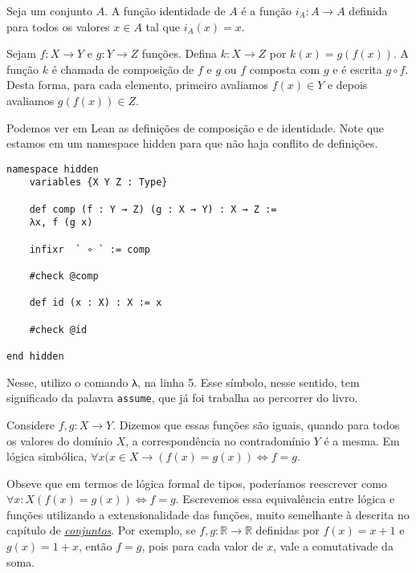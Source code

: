 \begin{definition}
    \label{def1}
    Seja um conjunto $A$. A função identidade de $A$ é a função $i_A : A
    \rightarrow A$ definida para todos os valores $x \in A$ tal que $i_A(x) =
    x$.
\end{definition}

\begin{definition}
    \label{def2}
    Sejam $f : X \rightarrow Y$ e $g : Y \rightarrow Z$ funções. Defina $k : X
    \rightarrow Z$ por $k(x) = g(f(x))$. A função $k$ é chamada de composição
    de $f$ e $g$ ou $f$ composta com $g$ e é escrita $g \circ f$. Desta forma,
    para cada elemento, primeiro  avaliamos $f(x) \in Y$ e depois avaliamos
    $g(f(x)) \in Z$.
\end{definition}

Podemos ver em Lean as definições de composição e de identidade. Note que
estamos em um namespace hidden para que não haja conflito de definições.

\begin{lstlisting}
namespace hidden
    variables {X Y Z : Type}

    def comp (f : Y → Z) (g : X → Y) : X → Z :=
    λx, f (g x)

    infixr  ` ∘ ` := comp

    #check @comp

    def id (x : X) : X := x

    #check @id

end hidden
\end{lstlisting}

Nesse, utilizo o comando \lstinline{λ}, na linha 5. Esse símbolo, nesse
sentido, tem significado da palavra \lstinline{assume}, que já foi trabalha ao
percorrer do livro.

\begin{definition}
    \label{def3}
    Considere $f,g : X \to Y$. Dizemos que essas funções são iguais, quando
    para todos os valores do domínio $X$, a correspondência no contradomínio
    $Y$ é a mesma. Em lógica simbólica, $\forall x (x \in X \to (f(x) = g(x))
    \iff f = g $.
\end{definition}

Obseve que em termos de lógica formal de tipos, poderíamos reescrever como
$\forall x : X (f(x) = g(x)) \iff f = g$. Escrevemos essa equivalência entre
lógica e funções utilizando a extensionalidade das funções, muito semelhante à
descrita no capítulo de \textit{\hyperlink{chapter.5}{conjuntos}}. Por
exemplo, se $f, g : \mathbb{R} \to \mathbb{R}$ definidas por $f(x) = x + 1$ e
$g(x) = 1 + x$, então $f = g$, pois para cada valor de $x$, vale a
comutativade da soma.


